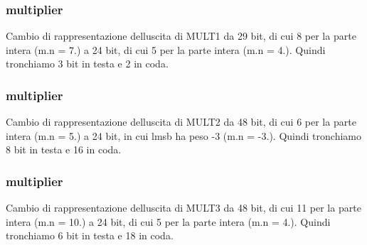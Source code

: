 \subsubsection[{\texorpdfstring{mult2}{mult2}}]{ {\bfseries \textcolor{vhdlchar}{multiplier}\textcolor{vhdlchar}{ }} \hspace{0.3cm}{\ttfamily [Instantiation]}}\hypertarget{class_linear_regression_1_1_structural_a7c5c7b6fb03b66e49b0eb767162f01a8}{}\label{class_linear_regression_1_1_structural_a7c5c7b6fb03b66e49b0eb767162f01a8}
Cambio di rappresentazione dell\textquotesingle{}uscita di M\+U\+L\+T1 da 29 bit, di cui 8 per la parte intera (m.\+n = 7.) a 24 bit, di cui 5 per la parte intera (m.\+n = 4.). Quindi tronchiamo 3 bit in testa e 2 in coda. 
\subsubsection[{\texorpdfstring{mult3}{mult3}}]{ {\bfseries \textcolor{vhdlchar}{multiplier}\textcolor{vhdlchar}{ }} \hspace{0.3cm}{\ttfamily [Instantiation]}}\hypertarget{class_linear_regression_1_1_structural_adf80c8ef67f9eb716830cfb9a6d3a980}{}\label{class_linear_regression_1_1_structural_adf80c8ef67f9eb716830cfb9a6d3a980}
Cambio di rappresentazione dell\textquotesingle{}uscita di M\+U\+L\+T2 da 48 bit, di cui 6 per la parte intera (m.\+n = 5.) a 24 bit, in cui l\textquotesingle{}msb ha peso -\/3 (m.\+n = -\/3.). Quindi tronchiamo 8 bit in testa e 16 in coda. 
\subsubsection[{\texorpdfstring{mult4}{mult4}}]{ {\bfseries \textcolor{vhdlchar}{multiplier}\textcolor{vhdlchar}{ }} \hspace{0.3cm}{\ttfamily [Instantiation]}}\hypertarget{class_linear_regression_1_1_structural_a65ae62ab3b1e6675bf4e4bcf572d2025}{}\label{class_linear_regression_1_1_structural_a65ae62ab3b1e6675bf4e4bcf572d2025}
Cambio di rappresentazione dell\textquotesingle{}uscita di M\+U\+L\+T3 da 48 bit, di cui 11 per la parte intera (m.\+n = 10.) a 24 bit, di cui 5 per la parte intera (m.\+n = 4.). Quindi tronchiamo 6 bit in testa e 18 in coda. 
